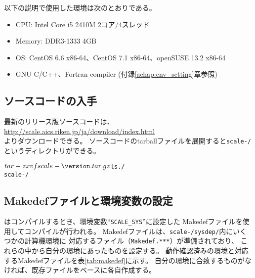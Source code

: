 以下の説明で使用した環境は次のとおりである。
\begin{itemize}
\item CPU: Intel Core i5 2410M 2コア/4スレッド
\item Memory: DDR3-1333 4GB
\item OS: CentOS 6.6 x86-64、CentOS 7.1 x86-64、openSUSE 13.2 x86-64
\item GNU C/C++、Fortran compiler (付録\ref{achap:env_setting}章参照)
\end{itemize}

\subsection{ソースコードの入手} \label{subsec:get_source_code}
最新のリリース版ソースコードは、\\
\url{http://scale.aics.riken.jp/ja/download/index.html}\\
よりダウンロードできる。
ソースコードのtarballファイルを展開すると\texttt{scale-{\version}/} というディレクトリができる。
\begin{alltt}
 $ tar -zxvf scale-{\version}.tar.gz
 $ ls ./
    scale-{\version}/
\end{alltt}

\subsection{Makedefファイルと環境変数の設定} \label{subsec:evniromnet}

\scalelib はコンパイルするとき、環境変数``\verb|SCALE_SYS|''に設定した
Makedefファイルを使用してコンパイルが行われる。
Makedefファイルは、\texttt{scale-{\version}/sysdep/}内にいくつかの計算機環境に
対応するファイル（\texttt{Makedef.***}）が準備されており、
これらの中から自分の環境にあったものを設定する。
動作確認済みの環境と対応するMakedefファイルを表\ref{tab:makedef}に示す。
自分の環境に合致するものがなければ、既存ファイルをベースに各自作成する。

